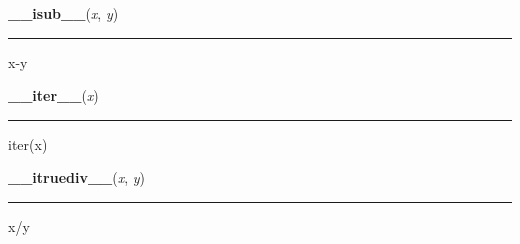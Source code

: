     \vspace{0.5ex}

    \begin{boxedminipage}{\textwidth}

    \raggedright \textbf{\_\_isub\_\_}(\textit{x}, \textit{y})

    \vspace{-1.5ex}

    \rule{\textwidth}{0.5\fboxrule}

x-y
    \vspace{1ex}

    \end{boxedminipage}

    \label{numpy:ndarray:__iter__}

    \vspace{0.5ex}

    \begin{boxedminipage}{\textwidth}

    \raggedright \textbf{\_\_iter\_\_}(\textit{x})

    \vspace{-1.5ex}

    \rule{\textwidth}{0.5\fboxrule}

iter(x)
    \vspace{1ex}

    \end{boxedminipage}

    \label{numpy:ndarray:__itruediv__}

    \vspace{0.5ex}

    \begin{boxedminipage}{\textwidth}

    \raggedright \textbf{\_\_itruediv\_\_}(\textit{x}, \textit{y})

    \vspace{-1.5ex}

    \rule{\textwidth}{0.5\fboxrule}

x/y
    \vspace{1ex}

    \end{boxedminipage}

    \label{numpy:ndarray:__ixor__}

    \vspace{0.5ex}

